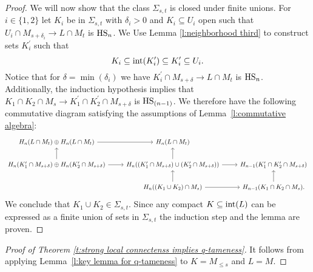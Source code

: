 \begin{proof}
	We will now show that the class $\Sigma_{s,t}$ is closed under finite unions.
	For $i \in \{1, 2\}$ let $K_i$ be in $\Sigma_{s,t}$ with $\delta_i > 0$ and $K_i \subseteq U_i$ open such that $U_{i} \cap M_{s+\delta_i} \to L \cap M_{t}$ is $\mathrm{HS}_n$.
	We Use Lemma \ref{l:neighborhood third} to construct sets $K_i^\prime$ such that
	\begin{equation*}
	K_i \subseteq \operatorname{int}(K_i^\prime) \subseteq K_i^\prime \subseteq U_i.
	\end{equation*}
	Notice that for $\delta = \min(\delta_i)$ we have $K_i^\prime \cap M_{s+\delta} \to L \cap M_t$ is $\mathrm{HS}_n$.
	Additionally, the induction hypothesis implies that $K_1 \cap K_2 \cap M_s \to K_1^\prime \cap K_2^\prime \cap M_{s+\delta}$ is $\mathrm{HS}_{(n-1)}$.
	We therefore have the following commutative diagram satisfying the assumptions of Lemma~\ref{l:commutative algebra}:
	\begin{equation*}
	\begin{tikzcd}
	H_n(L \cap M_t) \oplus H_n(L \cap M_t) \arrow[r] &
	H_n(L \cap M_t) & \\
	H_{n}(K_1^\prime \cap M_{s+\delta}) \oplus H_n(K_2^\prime \cap M_{s+\delta}) \arrow[r] \arrow[u] & 
	H_{n}((K_1^\prime \cap M_{s+\delta}) \cup (K_2^\prime \cap M_{s+\delta})) \arrow[r] \arrow[u] &
	H_{n-1}(K_1^\prime \cap K_2^\prime \cap M_{s+\delta}) \\ & 
	H_{n}((K_1 \cup K_2) \cap M_s) \arrow[r] \arrow[u] &
	H_{n-1}(K_1 \cap K_2 \cap M_s). \arrow[u]
	\end{tikzcd}
	\end{equation*}
	We conclude that $K_1 \cup K_2 \in \Sigma_{s, t}$.
	Since any compact $K \subseteq \operatorname{int}(L)$ can be expressed as a finite union of sets in $\Sigma_{s,t}$ the induction step and the lemma are proven.
\end{proof}

\begin{proof}[Proof of Theorem \ref{t:strong local connectenss implies q-tameness}]
	 It follows from applying Lemma~\ref{l:key lemma for q-tameness} to $K = M_{\leq s}$ and $L = M$.
\end{proof}
